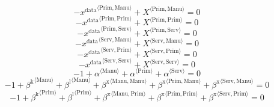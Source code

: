 \begin{equation}
-{x^{\mathrm{data}}}^{\langle \mathrm{\mathrm{Prim}},\mathrm{\mathrm{Manu}}\rangle} + {X}^{\langle \mathrm{Prim},\mathrm{Manu}\rangle} = 0
\end{equation}
\begin{equation}
-{x^{\mathrm{data}}}^{\langle \mathrm{\mathrm{Prim}},\mathrm{\mathrm{Prim}}\rangle} + {X}^{\langle \mathrm{Prim},\mathrm{Prim}\rangle} = 0
\end{equation}
\begin{equation}
-{x^{\mathrm{data}}}^{\langle \mathrm{\mathrm{Prim}},\mathrm{\mathrm{Serv}}\rangle} + {X}^{\langle \mathrm{Prim},\mathrm{Serv}\rangle} = 0
\end{equation}
\begin{equation}
-{x^{\mathrm{data}}}^{\langle \mathrm{\mathrm{Serv}},\mathrm{\mathrm{Manu}}\rangle} + {X}^{\langle \mathrm{Serv},\mathrm{Manu}\rangle} = 0
\end{equation}
\begin{equation}
-{x^{\mathrm{data}}}^{\langle \mathrm{\mathrm{Serv}},\mathrm{\mathrm{Prim}}\rangle} + {X}^{\langle \mathrm{Serv},\mathrm{Prim}\rangle} = 0
\end{equation}
\begin{equation}
-{x^{\mathrm{data}}}^{\langle \mathrm{\mathrm{Serv}},\mathrm{\mathrm{Serv}}\rangle} + {X}^{\langle \mathrm{Serv},\mathrm{Serv}\rangle} = 0
\end{equation}
\begin{equation}
-1 + {\alpha}^{\langle \mathrm{\mathrm{Manu}}\rangle} + {\alpha}^{\langle \mathrm{\mathrm{Prim}}\rangle} + {\alpha}^{\langle \mathrm{\mathrm{Serv}}\rangle} = 0
\end{equation}
\begin{equation}
-1 + {\beta^{\mathrm{k}}}^{\langle \mathrm{\mathrm{Manu}}\rangle} + {\beta^{\mathrm{l}}}^{\langle \mathrm{\mathrm{Manu}}\rangle} + {\beta^{\mathrm{x}}}^{\langle \mathrm{\mathrm{Manu}},\mathrm{\mathrm{Manu}}\rangle} + {\beta^{\mathrm{x}}}^{\langle \mathrm{\mathrm{Prim}},\mathrm{\mathrm{Manu}}\rangle} + {\beta^{\mathrm{x}}}^{\langle \mathrm{\mathrm{Serv}},\mathrm{\mathrm{Manu}}\rangle} = 0
\end{equation}
\begin{equation}
-1 + {\beta^{\mathrm{k}}}^{\langle \mathrm{\mathrm{Prim}}\rangle} + {\beta^{\mathrm{l}}}^{\langle \mathrm{\mathrm{Prim}}\rangle} + {\beta^{\mathrm{x}}}^{\langle \mathrm{\mathrm{Manu}},\mathrm{\mathrm{Prim}}\rangle} + {\beta^{\mathrm{x}}}^{\langle \mathrm{\mathrm{Prim}},\mathrm{\mathrm{Prim}}\rangle} + {\beta^{\mathrm{x}}}^{\langle \mathrm{\mathrm{Serv}},\mathrm{\mathrm{Prim}}\rangle} = 0
\end{equation}
